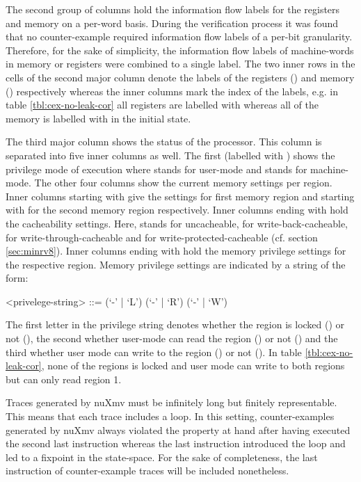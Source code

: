 The second group of columns hold the information flow labels for the registers and memory on a per-word basis.
During the verification process it was found that no counter-example required information flow labels of a per-bit granularity.
Therefore, for the sake of simplicity, the information flow labels of machine-words in memory or registers were combined to a single label.
The two inner rows in the cells of the second major column denote the labels of the registers () and memory () respectively whereas the inner columns mark the index of the labels, e.g. in table \ref{tbl:cex-no-leak-cor} all registers are labelled with \CT{} whereas all of the memory is labelled with \CU{} in the initial state.

The third major column shows the status of the processor.
This column is separated into five inner columns as well.
The first (labelled with ) shows the privilege mode of execution where  stands for user-mode and  stands for machine-mode.
The other four columns show the current memory settings per region.
Inner columns starting with  give the settings for first memory region and starting with  for the second memory region respectively.
Inner columns ending with  hold the cacheability settings.
Here,  stands for uncacheable,  for write-back-cacheable,  for write-through-cacheable and  for write-protected-cacheable (cf. section \ref{sec:minrv8}).
Inner columns ending with  hold the memory privilege settings for the respective region.
Memory privilege settings are indicated by a string of the form:
\begin{grammar}
    <privelege-string> ::= (`-' | `L') (`-' | `R') (`-' | `W')
\end{grammar}

The first letter in the privilege string denotes whether the region is locked () or not (\minrv{-}), the second whether user-mode can read the region () or not (\minrv{-}) and the third whether user mode can write to the region () or not (\minrv{-}).
In table \ref{tbl:cex-no-leak-cor}, none of the regions is locked and user mode can write to both regions but can only read region 1.

Traces generated by nuXmv must be infinitely long but finitely representable.
This means that each trace includes a loop.
In this setting, counter-examples generated by nuXmv always violated the property at hand after having executed the second last instruction whereas the last instruction introduced the loop and led to a fixpoint in the state-space.
For the sake of completeness, the last instruction of counter-example traces will be included nonetheless.

